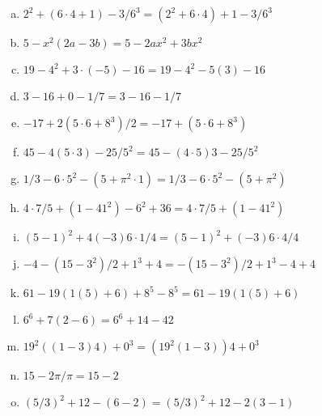 \documentclass[11pt,letterpaper]{article}
\begin{document}
\begin{enumerate}[(a)] \itemsep=2ex
        \item {} \qquad $2^2 + (6 \cdot 4 + 1) - 3/6^3 = (2^2 + 6 \cdot 4) + 1 - 3/6^3$
        \item {} \qquad $5 - x^2 (2a - 3b) = 5- 2ax^2 + 3bx^2$
        \item {} \qquad $19 - 4^2 + 3 \cdot (-5) - 16 = 19 - 4^2 - 5 (3) - 16$
        \item {} \qquad $3 - 16 + 0 -1/7 = 3 - 16 - 1/7$
        \item {} \qquad $-17 + 2(5 \cdot 6 + 8^3)/2 = -17 + (5 \cdot 6 + 8^3)$
        \item {} \qquad $45 - 4(5 \cdot 3) - 25/5^2 = 45 - (4 \cdot 5)3 - 25/5^2$
        \item {} \qquad $1/3 - 6 \cdot 5^2 - (5 + \pi^2 \cdot 1) = 1/3 - 6 \cdot 5^2 - (5 + \pi^2)$
        \item {} \qquad $4 \cdot 7/5 + (1 - 41^2) - 6^2 + 36 = 4 \cdot 7/5 + (1 - 41^2)$
        \item {} \qquad $(5 - 1)^2 + 4(-3)6 \cdot 1/4 = (5 - 1)^2 + (-3)6 \cdot 4/4$
        \item {} \qquad $-4 - (15 - 3^2)/2 + 1^3 + 4 = - (15 - 3^2)/2 + 1^3 - 4 + 4$
        \item {} \qquad $61 - 19( 1(5) + 6) + 8^5 - 8^5 = 61 - 19( 1(5) + 6)$
        \item {} \qquad $6^6 + 7(2 - 6) = 6^6 + 14 - 42$
        \item {} \qquad $19^2 ((1 - 3)4) + 0^3 = (19^2 (1 - 3))4 + 0^3$
        \item {} \qquad $15 - 2\pi/\pi = 15 - 2$
        \item {} \qquad $(5/3)^2 + 12 - (6 - 2) = (5/3)^2 + 12 - 2(3 - 1)$
        \end{enumerate}





\newpage
\end{document}

